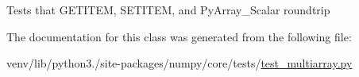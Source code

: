 \begin{DoxyVerb}Tests that GETITEM, SETITEM, and PyArray_Scalar roundtrip \end{DoxyVerb}
 

The documentation for this class was generated from the following file\+:\begin{DoxyCompactItemize}
\item 
venv/lib/python3./site-\/packages/numpy/core/tests/\hyperlink{core_2tests_2test__multiarray_8py}{test\+\_\+multiarray.\+py}\end{DoxyCompactItemize}
